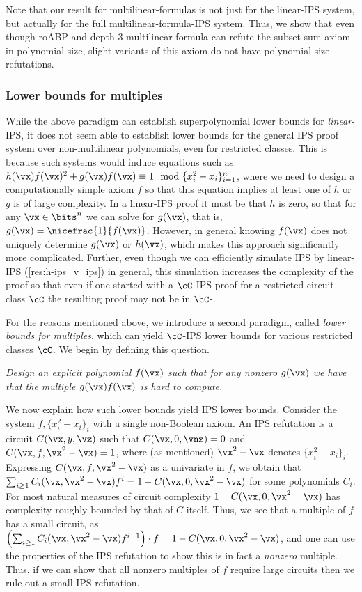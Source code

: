 \documentclass[11pt]{article}
\numberwithin{equation}{section}
\theoremstyle{definition}
\theoremstyle{plain}
\begin{document}
Note that our result for multilinear-formulas is not just for the linear-IPS system, but actually for the full multilinear-formula-IPS system. Thus, we show that even though roABP-\lIPS and depth-3 multilinear formula-\lbIPS can refute the subset-sum axiom in polynomial size, slight variants of this axiom do not have polynomial-size refutations.

\subsubsection{Lower bounds for multiples}\label{sec:intro:lbs-mult}

While the above paradigm can establish superpolynomial lower bounds for \emph{linear}-IPS, it does not seem able to establish lower bounds for the general IPS proof system over non-multilinear polynomials, even for restricted classes.  This is because such systems would induce equations such as $h(\vx) f(\vx)^2+g(\vx) f(\vx)\equiv 1 \mod \{x_i^2-x_i\}_{i=1}^n$, where we need to design a computationally simple axiom $f$ so that this equation implies at least one of $h$ or $g$ is of large complexity.  In a linear-IPS proof it must be that $h$ is zero, so that for any $\vx\in\bits^n$ we can solve for $g(\vx)$, that is, $g(\vx)=\nicefrac{1}{f(\vx)}$.  However, in general knowing $f(\vx)$ does not uniquely determine $g(\vx)$ or $h(\vx)$, which makes this approach significantly more complicated.  Further, even though we can efficiently simulate IPS by linear-IPS (\autoref{res:h-ips_v_ips}) in general, this simulation increases the complexity of the proof so that even if one started with a $\cC$-IPS proof for a restricted circuit class $\cC$ the resulting \lIPS proof may not be in $\cC$-\lIPS.
%

For the reasons mentioned above, %
we introduce a second paradigm, called \emph{lower bounds for multiples}, which can yield $\cC$-IPS lower bounds for various restricted classes $\cC$.  We begin by defining this question.

\begin{goal}
\emph{Design an explicit polynomial $f(\vx)$ such that for any nonzero $g(\vx)$ we have that the multiple $g(\vx)f(\vx)$ is hard to compute.}
\end{goal}

We now explain how such lower bounds yield IPS lower bounds.  Consider the system $f,\{x_i^2-x_i\}_i$ with a single non-Boolean axiom.  An IPS refutation is a circuit $C(\vx,y,\vz)$ such that $C(\vx,0,\vnz)=0$ and $C(\vx,f,\vx^2-\vx)=1$, where (as mentioned) $\vx^2-\vx$ denotes $\{x_i^2-x_i\}_i$.  Expressing $C(\vx,f,\vx^2-\vx)$ as a univariate in $f$, we obtain that $\sum_{i\ge 1} C_i(\vx,\vx^2-\vx) f^i = 1-C(\vx,0,\vx^2-\vx)$ for some polynomials $C_i$.  For most natural measures of circuit complexity $1-C(\vx,0,\vx^2-\vx)$ has complexity roughly bounded by that of $C$ itself.  Thus, we see that a multiple of $f$ has a small circuit, as $\left(\sum_{i\ge 1} C_i(\vx,\vx^2-\vx) f^{i-1}\right)\cdot f=1-C(\vx,0,\vx^2-\vx)$, and one can use the properties of the IPS refutation to show this is in fact a \emph{nonzero} multiple.  Thus, if we can show that all nonzero multiples of $f$ require large circuits then we rule out a small IPS refutation.
\end{document}
